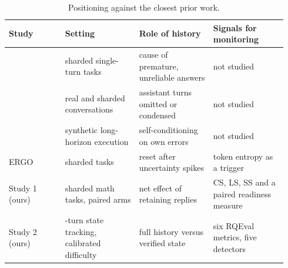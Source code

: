 \begin{table}[!htbp]
\centering
\caption{Positioning against the closest prior work.}
\label{tab:positioning}
\footnotesize
\setlength{\tabcolsep}{4pt}
\begin{tabular}{@{}>{\raggedright\arraybackslash}p{0.19\linewidth}
>{\raggedright\arraybackslash}p{0.25\linewidth}
>{\raggedright\arraybackslash}p{0.25\linewidth}
>{\raggedright\arraybackslash}p{0.25\linewidth}@{}}
\toprule
Study & Setting & Role of history & Signals for monitoring\\
\midrule
\citet{laban2025lost} & sharded single-turn tasks & cause of premature,
unreliable answers & not studied\\
\citet{huang2026benefit} & real and sharded conversations & assistant turns
omitted or condensed & not studied\\
\citet{sinha2025illusion} & synthetic long-horizon execution & self-conditioning
on own errors & not studied\\
ERGO \citep{khalid2025ergo} & sharded tasks & reset after uncertainty spikes &
token entropy as a trigger\\
Study 1 (ours) & sharded math tasks, paired arms & net effect of retaining
replies & CS, LS, SS and a paired readiness measure\\
Study 2 (ours) & 100-turn state tracking, calibrated difficulty & full history
versus verified state & six RQEval metrics, five detectors\\
\bottomrule
\end{tabular}
\end{table}
